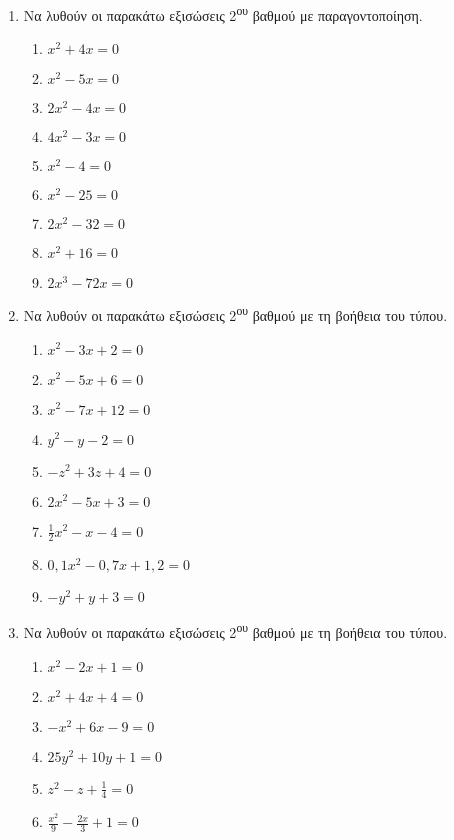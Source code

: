\documentclass[twoside]{article}
\begin{document}
\begin{enumerate}
\item Να λυθούν οι παρακάτω εξισώσεις 2\textsuperscript{ου} βαθμού με παραγοντοποίηση.
\begin{multicols}{3}
\begin{enumerate}[label=\roman*.]
\item $ x^2+4x=0 $
\item $ x^2-5x=0 $
\item $ 2x^2-4x=0 $
\item $ 4x^2-3x=0 $
\item $ x^2-4=0 $
\item $ x^2-25=0 $
\item $ 2x^2-32=0 $
\item $ x^2+16=0 $
\item $ 2x^3-72x=0 $
\end{enumerate}
\end{multicols}
\item Να λυθούν οι παρακάτω εξισώσεις 2\textsuperscript{ου} βαθμού με τη βοήθεια του τύπου.
\begin{multicols}{3}
\begin{enumerate}[label=\roman*.]
\item $ x^2-3x+2=0 $
\item $ x^2-5x+6=0 $
\item $ x^2-7x+12=0 $
\item $ y^2-y-2=0 $
\item $ -z^2+3z+4=0 $
\item $ 2x^2-5x+3=0 $
\item $ \frac{1}{2}x^2-x-4=0 $
\item $ 0{,}1x^2-0{,}7x+1{,}2=0 $
\item $ -y^2+y+3=0 $
\end{enumerate}
\end{multicols}
\item Να λυθούν οι παρακάτω εξισώσεις 2\textsuperscript{ου} βαθμού με τη βοήθεια του τύπου.
\begin{multicols}{3}
\begin{enumerate}[label=\roman*.]
\item $ x^2-2x+1=0 $
\item $ x^2+4x+4=0 $
\item $ -x^2+6x-9=0 $
\item $ 25y^2+10y+1=0 $
\item $ z^2-z+\frac{1}{4}=0 $
\item $ \frac{x^2}{9}-\frac{2x}{3}+1=0 $
\end{enumerate}

\end{multicols}
\end{enumerate}
\end{document}
